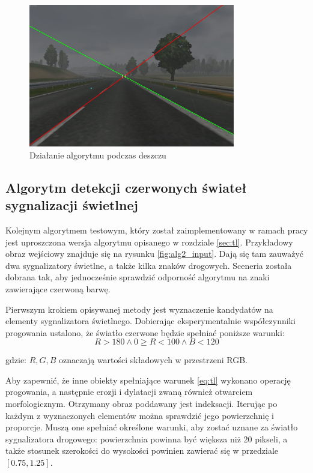 \begin{figure}
  \centering
  \includegraphics[width=9cm]{img/alg1_rain.jpg}
  \caption{Działanie algorytmu podczas deszczu}
  \label{fig:alg1_rain}
\end{figure}


\subsection{Algorytm detekcji czerwonych świateł sygnalizacji świetlnej} 

Kolejnym algorytmem testowym, który został zaimplementowany w ramach pracy jest uproszczona wersja algorytmu opisanego w rozdziale \ref{sec:tl}. 
Przykładowy obraz wejściowy znajduje się na rysunku \ref{fig:alg2_input}. 
Dają się tam zauważyć dwa sygnalizatory świetlne, a także kilka znaków drogowych. 
Sceneria została dobrana tak, aby jednocześnie sprawdzić odporność algorytmu na znaki zawierające czerwoną barwę.

Pierwszym krokiem opisywanej metody jest wyznaczenie kandydatów na elementy sygnalizatora świetlnego. 
Dobierając eksperymentalnie współczynniki progowania ustalono, że światło czerwone będzie spełniać poniższe warunki:
\begin{equation}
\label{eq:tl}
R>180 \wedge 0 \geq R<100 \wedge B < 120
\end{equation}

gdzie: $R, G, B$ oznaczają wartości składowych w przestrzeni RGB.

Aby zapewnić, że inne obiekty spełniające warunek \ref{eq:tl} wykonano operację progowania, a następnie erozji i dylatacji zwaną również otwarciem morfologicznym. %
Otrzymany obraz poddawany jest indeksacji. 
Iterując po każdym z wyznaczonych elementów można sprawdzić jego powierzchnię i proporcje. 
Muszą one spełniać określone warunki, aby zostać uznane za światło sygnalizatora drogowego: powierzchnia powinna być większa niż 20 pikseli, a także stosunek szerokości do wysokości powinien zawierać się w przedziale $[0.75, 1.25]$.

